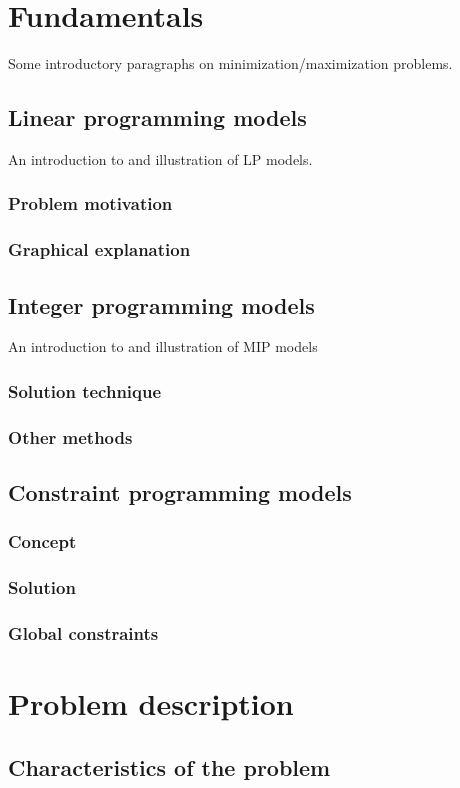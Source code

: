 \documentclass[13pt, letterpaper, twoside]{book}
\begin{document}
\chapter{Fundamentals}
Some introductory paragraphs on minimization/maximization problems.
\section{Linear programming models}
An introduction to and illustration of LP models.
\subsection{Problem motivation}
\subsection{Graphical explanation}
\section{Integer programming models}
An introduction to and illustration of MIP models
\subsection{Solution technique}
\subsection{Other methods}
\section{Constraint programming models}
\subsection{Concept}
\subsection{Solution}
\subsection{Global constraints}

\chapter{Problem description}
\section{Characteristics of the problem}
\end{document}
